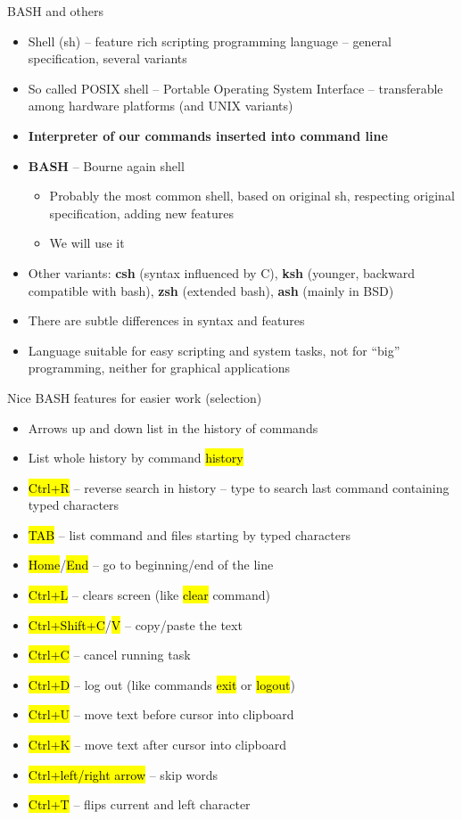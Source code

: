 \documentclass[compress, ucs, xelatex, 11pt, xcolor=svgnames,
  hyperref={
    bookmarks=true,
    unicode=true,
    colorlinks=true,
    pdftitle={Linux, command line and MetaCentrum},
    plainpages=false,
    pdfauthor={Vojtech Zeisek},
    pdfsubject={Course about use of Linux command line, writing shell scripts and using MetaCentrum of CESNET},
    pdfcreator={XeLaTeX},
    pdfkeywords={Linux, GNU, BASH, shell, command line, MetaCentrum},
    linkcolor=Red,
    anchorcolor=Blue,
    citecolor=Purple,
    filecolor=DodgerBlue,
    menucolor=DarkOrchid,
    urlcolor=DeepSkyBlue,
    pdftex},
  url={hyphens, lowtilde} %
  ]{beamer}
\renewcommand{\texttt}[1]{\hl{\ttfamily #1}}
\begin{document}
\begin{frame}{BASH and others}
\begin{itemize}
  \item Shell (sh) -- feature rich scripting programming language -- general specification, several variants
  \item So called POSIX shell -- Portable Operating System Interface -- transferable among hardware platforms (and UNIX variants)
  \item \textbf{Interpreter of our commands inserted into command line}
  \item \textbf{BASH} -- Bourne again shell
  \begin{itemize}
    \item Probably the most common shell, based on original sh, respecting original specification, adding new features
    \item We will use it
  \end{itemize}
  \item Other variants: \textbf{csh} (syntax influenced by C), \textbf{ksh} (younger, backward compatible with bash), \textbf{zsh} (extended bash), \textbf{ash} (mainly in BSD)
  \item There are subtle differences in syntax and features
  \item Language suitable for easy scripting and system tasks, not for ``big'' programming, neither for graphical applications
\end{itemize}
\end{frame}

\begin{frame}{Nice BASH features for easier work (selection)}
\begin{itemize}
  \item Arrows up and down list in the history of commands
  \item List whole history by command \texttt{history}
  \item \texttt{Ctrl+R} -- reverse search in history -- type to search last command containing typed characters
  \item \texttt{TAB} -- list command and files starting by typed characters
  \item \texttt{Home}/\texttt{End} -- go to beginning/end of the line
  \item \texttt{Ctrl+L} -- clears screen (like \texttt{clear} command)
  \item \texttt{Ctrl+Shift+C}/\texttt{V} -- copy/paste the text
  \item \texttt{Ctrl+C} -- cancel running task
  \item \texttt{Ctrl+D} -- log out (like commands \texttt{exit} or \texttt{logout})
  \item \texttt{Ctrl+U} -- move text before cursor into clipboard
  \item \texttt{Ctrl+K} -- move text after cursor into clipboard
  \item \texttt{Ctrl+left/right arrow} -- skip words
  \item \texttt{Ctrl+T} -- flips current and left character
\end{itemize}
\end{frame}
\end{document}
